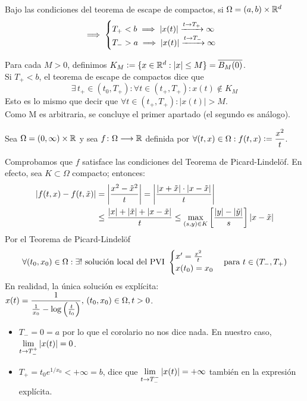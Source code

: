 \begin{cor}
	Bajo las condiciones del teorema de escape de compactos, si $\Omega = (a, b) \times \mathbb{R}^d$
	\[\implies \begin{cases}
			T_+ < b \implies \left|x(t)\right| \xrightarrow{t\to T_+} \infty \\
			T_- > a \implies \left|x(t)\right| \xrightarrow{t\to T_-} \infty \\
		\end{cases}\]
	\begin{dem}
		Para cada $M>0$, definimos $K_M\vcentcolon= \{x \in \mathbb{R}^d : |x|\leq M \} = \overline{B_M(0)}$.\\
		Si $T_+<b$, el teorema de escape de compactos dice que
		\[\exists \, t_+ \in (t_0,T_+) : \forall t \in (t_+,T_+) : x(t)\notin K_M\]
		Esto es lo mismo que decir que $\forall t \in (t_+,T_+) : |x(t)|>M$.\\
		Como M es arbitraria, se concluye el primer apartado (el segundo es análogo).
	\end{dem}
\end{cor}

\begin{ejem}
	Sea $\Omega = (0, \infty ) \times \mathbb{R}$ y sea $f \colon \Omega \longrightarrow \mathbb{R}$ definida por $\displaystyle \forall (t,x) \in \Omega : f(t,x)\vcentcolon=\frac{x^2}{t}$.

	Comprobamos que $f$ satisface las condiciones del Teorema de Picard-Lindelöf. En efecto, sea $K \subset \Omega$ compacto; entonces:
	\[\begin{aligned}
			\left|f(t,x)-f(t,\Tilde{x})\right| & = \left | \frac{x^2-\Tilde{x}^2}{t}\right | = \left | \frac{|x+\Tilde{x}|\cdot|x-\Tilde{x}|}{t}\right |                          \\
			                            & \leq \frac{|x|+|\Tilde{x}| + |x-\Tilde{x}|}{t} \leq \displaystyle \max_{(s,y)\in K}\left [ \frac{|y|-|\Tilde{y}|}{s}\right ] |x-\Tilde{x}|
		\end{aligned}\]
	Por el Teorema de Picard-Lindelöf
	\[\forall (t_0,x_0)\in \Omega : \exists ! \text{ solución local del PVI }\displaystyle \begin{cases} x'=\frac{x^2}{t} \\ x(t_0)=x_0 \end{cases} \text{para } t \in (T_-,T_+)\]
	En realidad, la única solución es explícita:
	$\displaystyle x(t)=\frac{1}{\frac{1}{x_0}-\log \left(\frac{t}{t_0} \right)}, \, (t_0,x_0)\in \Omega, t>0$.

	\begin{itemize}
		\item $T_-=0=a$ por lo que el corolario no nos dice nada. En nuestro caso, $\displaystyle \lim_{t\to T_-^+} |x(t)| = 0$.
		\item $T_+=t_0 e^{1/x_0} < + \infty = b$, dice que $\displaystyle \lim_{t\to T_-^-}|x(t)| = + \infty$ también en la expresión explícita.
	\end{itemize}
\end{ejem}

